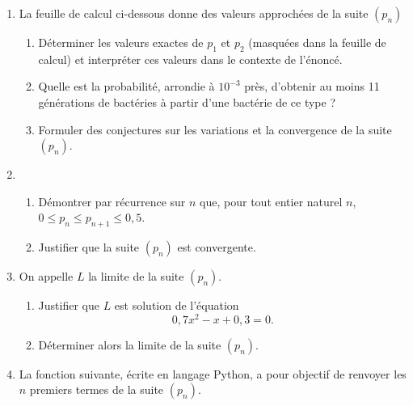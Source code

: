 \begin{enumerate}
	\item La feuille de calcul ci-dessous donne des valeurs approchées de la suite $\left(p_n\right)$
	\begin{center}
	\end{center}
	\begin{enumerate}
		\item Déterminer les valeurs exactes de $p_1$ et $p_2$ (masquées dans la feuille de calcul) et interpréter ces valeurs dans le contexte de l'énoncé.
		\item Quelle est la probabilité, arrondie à $10^{-3}$ près, d'obtenir au moins 11 générations de bactéries à partir d'une bactérie de ce type ?
		\item Formuler des conjectures sur les variations et la convergence de la suite $\left(p_n\right)$.
	\end{enumerate}
	\item 
	\begin{enumerate}
		\item Démontrer par récurrence sur $n$ que,
		pour tout entier naturel $n$, $0 \leqslant p_n \leqslant p_{n+1} \leqslant0,5$.
		\item Justifier que la suite $\left(p_n\right)$ est convergente.
	\end{enumerate}
	\item On appelle $L$ la limite de la suite $\left(p_n\right)$.
	\begin{enumerate}
		\item Justifier que $L$ est solution de l'équation \[0,7x^2 - x  + 0,3 = 0.\]
		\item Déterminer alors la limite de la suite $\left(p_n\right)$.
	\end{enumerate}
	\item La fonction suivante, écrite en langage \textsf{Python}, a pour objectif de renvoyer les $n$ premiers termes de la suite $\left(p_n\right)$.
	

\end{enumerate}
